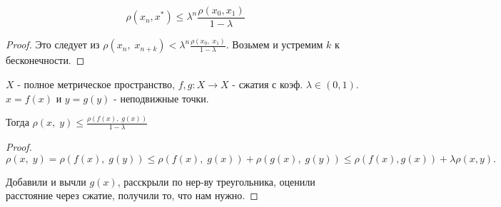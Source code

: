 \begin{statement}\thmslashn
	
	$$
	\rho(x_n, x^*) \leq \lambda^n \frac{\rho(x_0, x_1)}{1 - \lambda}
	$$
	\begin{proof} \thmslashn
		
		Это следует из $\rho(x_n,\;x_{n + k}) < \lambda^n \frac{\rho(x_{0},\; x_{1})}{1 - \lambda}$. Возьмем и устремим $k$ к бесконечности.
	\end{proof}
\end{statement}

\begin{consequence} \thmslashn
	
	$X$ - полное метрическое пространство, $f, g: X \rightarrow X$ - сжатия с коэф. $\lambda \in (0, 1)$. $x = f(x)$ и $y = g(y)$ - неподвижные точки.
	
	Тогда $\rho(x,\; y) \leq \frac{\rho(f(x),\; g(x))}{1- \lambda}$
	\begin{proof} \thmslashn
		
		$$
		\rho(x,\;y) = \rho(f(x),\; g(y)) \leq \rho(f(x),\; g(x)) + \rho(g(x),\; g(y)) \leq \rho(f(x), g(x)) + \lambda \rho(x, y). 
		$$
		
		Добавили и вычли $g(x)$, расскрыли по нер-ву треугольника, оценили расстояние через сжатие, получили то, что нам нужно.
	\end{proof}
\end{consequence}


